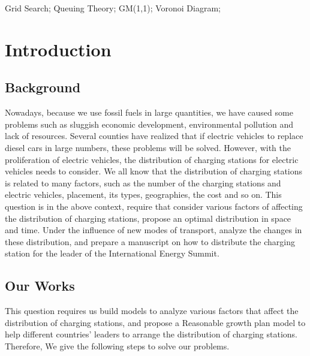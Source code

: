 \documentclass{mcmthesis}
\begin{document}
\begin{keywords}
Grid Search;   Queuing Theory;  GM(1,1); Voronoi Diagram; 
\end{keywords}

\maketitle
\tableofcontents

\section{Introduction}

\subsection{Background}

\par Nowadays, because we use fossil fuels in large quantities, we have caused some problems such as sluggish economic development, environmental pollution and lack of resources. Several counties have realized that if electric vehicles to replace diesel cars in large numbers, these problems will be solved. However, with the proliferation of electric vehicles, the distribution of charging stations for electric vehicles needs to consider. We all know that the distribution of charging stations is related to many factors, such as the number of the charging stations and electric vehicles, placement, its types, geographies, the cost and so on. This question is in the above context, require that consider various factors of affecting the distribution of charging stations, propose an optimal distribution in space and time. Under the influence of new modes of transport, analyze the changes in these distribution, and prepare a manuscript on how to distribute the charging station for the leader of the International Energy Summit.



\subsection{Our Works}
This question requires us build models to analyze various factors that affect the distribution of charging stations, and propose a Reasonable growth plan model to help different countries’ leaders to arrange the distribution of charging stations. Therefore, We give the following steps to solve our problems.
\end{document}
